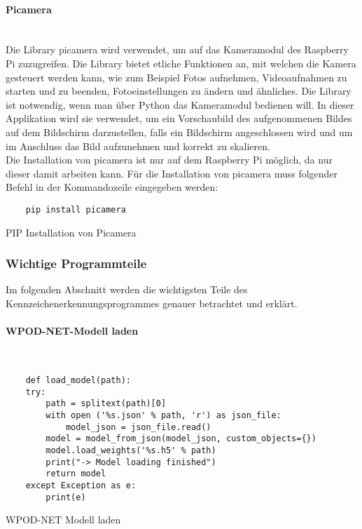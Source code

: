 \paragraph{Picamera}\mbox{}\\
Die Library picamera wird verwendet, um auf das Kameramodul des Raspberry Pi zuzugreifen. Die Library bietet etliche Funktionen an, 
mit welchen die Kamera gesteuert werden kann, wie zum Beispiel Fotos aufnehmen, Videoaufnahmen zu starten und zu beenden, Fotoeinstellungen 
zu ändern und ähnliches. Die Library ist notwendig, wenn man über Python das Kameramodul bedienen will. In dieser Applikation wird sie verwendet, 
um ein Vorschaubild des aufgenommenen Bildes auf dem Bildschirm darzustellen, falls ein Bildschirm angeschlossen wird und um im 
Anschluss das Bild aufzunehmen und korrekt zu skalieren.\\

Die Installation von picamera ist nur auf dem Raspberry Pi möglich, da nur dieser damit arbeiten kann. 
Für die Installation von picamera muss folgender Befehl in der Kommandozeile eingegeben werden:

\begin{listing}[H]
    \begin{verbatim}
    pip install picamera
    \end{verbatim}
    \caption{PIP Installation von Picamera}
\end{listing}

\subsubsection{Wichtige Programmteile}

Im folgenden Abschnitt werden die wichtigsten Teile des Kennzeichenerkennungsprogrammes genauer betrachtet und erklärt.

\paragraph{WPOD-NET-Modell laden}\mbox{}\\

\begin{listing}[H]
    \begin{verbatim}
    def load_model(path):
    try:
        path = splitext(path)[0]
        with open ('%s.json' % path, 'r') as json_file:
            model_json = json_file.read()
        model = model_from_json(model_json, custom_objects={})
        model.load_weights('%s.h5' % path)
        print("-> Model loading finished")
        return model
    except Exception as e:
        print(e)
    \end{verbatim}
    \caption{WPOD-NET Modell laden}
\end{listing}

